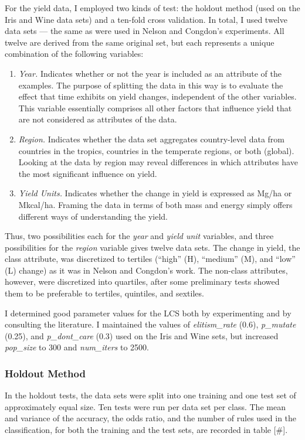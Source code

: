 \documentclass[11pt]{article}
\begin{document}
For the yield data, I employed two kinds of test: the holdout method (used on the Iris and Wine data sets) and a ten-fold cross validation. In total, I used twelve data sets --- the same as were used in Nelson and Congdon's experiments. All twelve are derived from the same original set, but each represents a unique combination of the following variables:
\begin{enumerate}
\item \textit{Year.} Indicates whether or not the year is included as an attribute of the examples. The purpose of splitting the data in this way is to evaluate the effect that time exhibits on yield changes, independent of the other variables. This variable essentially comprises all other factors that influence yield that are not considered as attributes of the data.
\item \textit{Region.} Indicates whether the data set aggregates country-level data from countries in the tropics, countries in the temperate regions, or both (global). Looking at the data by region may reveal differences in which attributes have the most significant influence on yield.
\item \textit{Yield Units.} Indicates whether the change in yield is expressed as Mg/ha or Mkcal/ha. Framing the data in terms of both mass and energy simply offers different ways of understanding the yield.
\end{enumerate}
Thus, two possibilities  each for the \textit{year} and \textit{yield unit} variables, and three possibilities for the \textit{region} variable gives twelve data sets. The change in yield, the class attribute, was discretized to tertiles (``high'' (H), ``medium'' (M), and ``low'' (L) change) as it was in Nelson and Congdon's work. The non-class attributes, however, were discretized into quartiles, after some preliminary tests showed them to be preferable to tertiles, quintiles, and sextiles.

I determined good parameter values for the LCS both by experimenting and by consulting the literature. I maintained the values of \textit{elitism\_rate} (0.6), \textit{p\_mutate} (0.25), and \textit{p\_dont\_care} (0.3) used on the Iris and Wine sets, but increased \textit{pop\_size} to 300 and \textit{num\_iters} to 2500.

\subsubsection{Holdout Method}

In the holdout tests, the data sets were split into one training and one test set of approximately equal size. Ten tests were run per data set per class. The mean and variance of the accuracy, the odds ratio, and the number of rules used in the classification, for both the training and the test sets, are recorded in table [\#].
\end{document}

